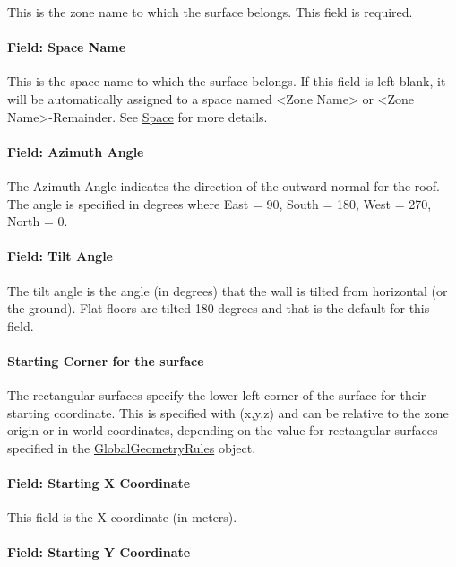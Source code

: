 This is the zone name to which the surface belongs. This field is required.

\paragraph{Field: Space Name}\label{field-space-name-8-003}

This is the space name to which the surface belongs. If this field is left blank, it will be automatically assigned to a space named <Zone Name> or <Zone Name>-Remainder. See \hyperref[space]{Space} for more details.

\paragraph{Field: Azimuth Angle}\label{field-azimuth-angle-8}

The Azimuth Angle indicates the direction of the outward normal for the roof. The angle is specified in degrees where East = 90, South = 180, West = 270, North = 0.

\paragraph{Field: Tilt Angle}\label{field-tilt-angle-8}

The tilt angle is the angle (in degrees) that the wall is tilted from horizontal (or the ground). Flat floors are tilted 180 degrees and that is the default for this field.

\paragraph{Starting Corner for the surface}\label{starting-corner-for-the-surface-8}

The rectangular surfaces specify the lower left corner of the surface for their starting coordinate. This is specified with (x,y,z) and can be relative to the zone origin or in world coordinates, depending on the value for rectangular surfaces specified in the \hyperref[globalgeometryrules]{GlobalGeometryRules} object.

\paragraph{Field: Starting X Coordinate}\label{field-starting-x-coordinate-8}

This field is the X coordinate (in meters).

\paragraph{Field: Starting Y Coordinate}\label{field-starting-y-coordinate-8}

